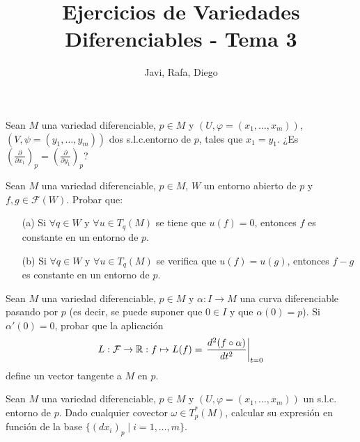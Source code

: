 \documentclass[twoside]{article}
\begin{document}
\title{Ejercicios de Variedades Diferenciables - Tema 3}
\author{Javi, Rafa, Diego}
\maketitle



\begin{ejercicio}{1}\label{1}
Sean $M$ una variedad diferenciable, $p \in M$ y $(U, \varphi = (x_1, \dots , x_m))$, $(V, \psi =
(y_1, \dots , y_m))$ dos s.l.c.entorno de $p$, tales que $x_1 = y_1$. ¿Es $\left(
\frac{\partial}{\partial x_1}\right)_p = \left(\frac{\partial}{\partial y_1}\right)_p$?
\end{ejercicio}
\begin{solucion}

\end{solucion}

\newpage

\begin{ejercicio}{2}
Sean $M$ una variedad diferenciable, $p \in M$, $W$ un entorno abierto de $p$ y
$f,g \in \mathcal{F}(W)$. Probar que:

\begin{itemize}
\item[(a)] Si $\forall q \in W$ y $\forall u \in  T_q(M)$ se tiene que $u(f) = 0$, entonces $f$ es constante
en un entorno de $p$.
\item[(b)] Si $\forall q \in W$ y $\forall u \in T_q(M)$ se verifica que $u(f) = u(g)$, entonces $f - g$ es
constante en un entorno de $p$.
\end{itemize}
\end{ejercicio}
\begin{solucion}

\end{solucion}

\newpage

\begin{ejercicio}{3}
Sean $M$ una variedad diferenciable, $p \in M$ y $\alpha : I \to M$ una curva diferenciable
pasando por $p$ (es decir, se puede suponer que $0 \in I$ y que $\alpha(0) = p$).
Si $\alpha'(0) = 0$, probar que la aplicación
$$L:\mathcal{F}\to\mathbb{R}:f\mapsto L(f)=\left.\frac{d^2(f\circ\alpha)}{dt^2}\right|_{t=0}$$
define un vector tangente a $M$ en $p$.
\end{ejercicio}
\begin{solucion}

\end{solucion}

\newpage

\begin{ejercicio}{4}
Sean $M$ una variedad diferenciable, $p \in M$ y $(U, \varphi = (x_1, \dots , x_m))$ un s.l.c.
entorno de $p$. Dado cualquier covector $\omega \in T^*_p (M)$, calcular su expresión en
función de la base $\{(dx_i)_p \mid i = 1, \dots ,m\}$.
\end{ejercicio}
\begin{solucion}

\end{solucion}
\end{document}
